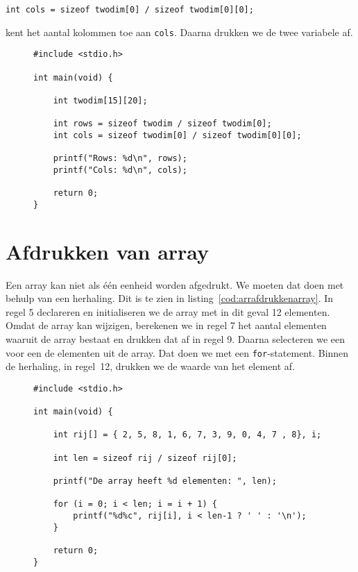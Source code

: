\hspace*{1em}\texttt{int cols = sizeof twodim[0] / sizeof twodim[0][0];}

kent het aantal kolommen toe aan \texttt{cols}. Daarna drukken we de twee variabele af.

\begin{figure}[!ht]
\begin{lstlisting}[caption=Bepalen van het aantal rijen en kolommen.,label=cod:arrsizetwodim]
#include <stdio.h>

int main(void) {

	int twodim[15][20];

	int rows = sizeof twodim / sizeof twodim[0];
	int cols = sizeof twodim[0] / sizeof twodim[0][0];

	printf("Rows: %d\n", rows);
	printf("Cols: %d\n", cols);

	return 0;
}
\end{lstlisting}
\end{figure}
\section{Afdrukken van array}
Een array kan niet als één eenheid worden afgedrukt. We moeten dat doen met behulp van een herhaling. Dit is te zien in listing~\ref{cod:arrafdrukkenarray}. In regel 5 declareren en initialiseren we de array met in dit geval 12 elementen. Omdat de array kan wijzigen, berekenen we in regel 7 het aantal elementen waaruit de array bestaat en drukken dat af in regel 9. Daarna selecteren we een voor een de elementen uit de array. Dat doen we met een \texttt{for}-statement. Binnen de herhaling, in regel~12, drukken we de waarde van het element af.

\begin{figure}[!ht]
\begin{lstlisting}[caption=Afdrukken van een array.,label=cod:arrafdrukkenarray]
#include <stdio.h>

int main(void) {

    int rij[] = { 2, 5, 8, 1, 6, 7, 3, 9, 0, 4, 7 , 8}, i;

    int len = sizeof rij / sizeof rij[0];

    printf("De array heeft %d elementen: ", len);

    for (i = 0; i < len; i = i + 1) {
        printf("%d%c", rij[i], i < len-1 ? ' ' : '\n');
    }

    return 0;
}
\end{lstlisting}
\end{figure}

